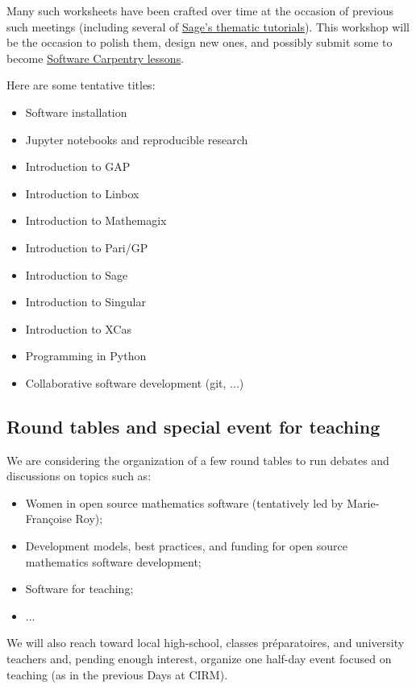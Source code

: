 \documentclass[12pt]{amsart}
\begin{document}
Many such worksheets have been crafted over time at the occasion of
previous such meetings (including several of
\href{http://doc.sagemath.org/html/en/thematic_tutorials/}{Sage's
  thematic tutorials}). This workshop will be the occasion to polish them,
design new ones, and possibly submit some to become
\href{http://software-carpentry.org/lessons/}{Software Carpentry lessons}.

Here are some tentative titles:
\begin{itemize}
\item Software installation
\item Jupyter notebooks and reproducible research
\item Introduction to GAP
\item Introduction to Linbox
\item Introduction to Mathemagix
\item Introduction to Pari/GP
\item Introduction to Sage
\item Introduction to Singular
\item Introduction to XCas
\item Programming in Python
\item Collaborative software development (git, ...)
\end{itemize}

\subsection{Round tables and special event for teaching}

We are considering the organization of a few round tables to run
debates and discussions on topics such as:

\begin{itemize}
\item Women in open source mathematics software (tentatively led by
  Marie-Françoise Roy);
\item Development models, best practices, and funding for open source
  mathematics software development;
\item Software for teaching;
\item ...
\end{itemize}

We will also reach toward local high-school, classes préparatoires,
and university teachers and, pending enough interest, organize one
half-day event focused on teaching (as in the previous \Sage Days at
CIRM).
\end{document}
